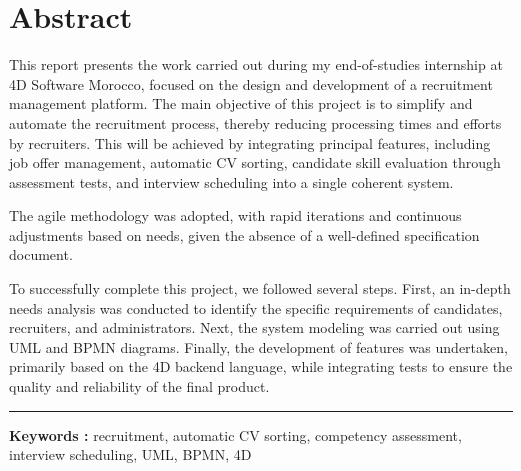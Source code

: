 \chapter*{Abstract}


\begin{spacing}{1.25}

This report presents the work carried out during my end-of-studies internship at 4D Software Morocco, focused on the design and development of a recruitment management platform. 
The main objective of this project is to simplify and 
automate the recruitment process, thereby reducing processing 
times and efforts by recruiters. This will be achieved by 
integrating principal features, including job offer management, automatic CV sorting, candidate skill evaluation through assessment tests, and interview scheduling into a single coherent system.
\newline

The agile methodology was adopted, with rapid iterations and continuous adjustments based on needs, given the absence of a well-defined specification document.
\newline


To successfully complete this project, we followed several steps. First, an in-depth needs analysis was conducted to identify the specific requirements of candidates, recruiters, and administrators. Next, the system modeling was carried out using UML and BPMN diagrams. Finally, the development of features was undertaken, primarily based on the 4D backend language, while integrating tests to ensure the quality and reliability of the final product.
\newline


\end{spacing}

\vspace{1cm}
\noindent\rule[2pt]{\textwidth}{0.5pt}
\textbf{Keywords :} recruitment, automatic CV sorting, competency assessment, interview scheduling, UML, BPMN, 4D
